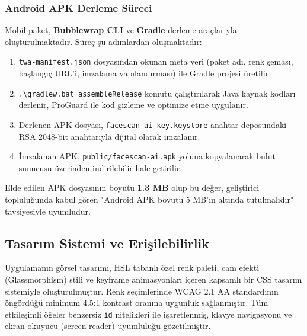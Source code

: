\subsubsection{Android APK Derleme Süreci}
Mobil paket, \textbf{Bubblewrap CLI} ve \textbf{Gradle} derleme araçlarıyla oluşturulmaktadır. Süreç şu adımlardan oluşmaktadır:

\begin{enumerate}
  \item \texttt{twa-manifest.json} dosyasından okunan meta veri (paket adı, renk şeması, başlangıç URL'i, imzalama yapılandırması) ile Gradle projesi üretilir.
  \item \texttt{.\textbackslash gradlew.bat assembleRelease} komutu çalıştırılarak Java kaynak kodları derlenir, ProGuard ile kod gizleme ve optimize etme uygulanır.
  \item Derlenen APK dosyası, \texttt{facescan-ai-key.keystore} anahtar deposundaki RSA 2048-bit anahtarıyla dijital olarak imzalanır.
  \item İmzalanan APK, \texttt{public/facescan-ai.apk} yoluna kopyalanarak bulut sunucusu üzerinden indirilebilir hale getirilir.
\end{enumerate}

Elde edilen APK dosyasının boyutu \textbf{1.3 MB} olup bu değer, geliştirici topluluğunda kabul gören "Android APK boyutu 5 MB'ın altında tutulmalıdır" tavsiyesiyle uyumludur.

\subsection{Tasarım Sistemi ve Erişilebilirlik}

Uygulamanın görsel tasarımı, HSL tabanlı özel renk paleti, cam efekti (Glassmorphism) stili ve keyframe animasyonları içeren kapsamlı bir CSS tasarım sistemiyle oluşturulmuştur. Renk seçimlerinde WCAG 2.1 AA standardının öngördüğü minimum 4.5:1 kontrast oranına uygunluk sağlanmıştır. Tüm etkileşimli öğeler benzersiz \texttt{id} nitelikleri ile işaretlenmiş, klavye navigasyonu ve ekran okuyucu (screen reader) uyumluluğu gözetilmiştir.
